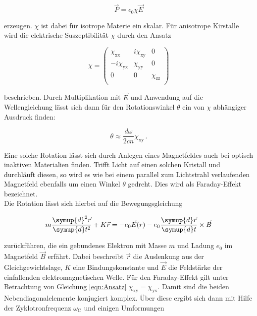 \begin{equation*}
    \vec{P} = \epsilon_0 \chi \vec{E}
\end{equation*}

erzeugen. $\chi$ ist dabei für isotrope Materie ein skalar. Für anisotrope Kirstalle wird die elektrische Suszeptibilität $\chi$ durch 
den Ansatz 

\begin{equation}
    \chi = \left( \begin{array}{rrr}\chi_\text{xx} & i\chi_\text{xy} & 0 \\-i\chi_\text{yx} & \chi_\text{yy} & 0\\0 & 0 & \chi_\text{zz}\\\end{array}\right)
    \label{eqn:Ansatz}
\end{equation}

beschrieben. Durch Multiplikation mit $\vec{E}$ und Anwendung auf die Wellengleichung lässt sich dann für den Rotationswinkel $\theta$ 
ein von $\chi$ abhängiger Ausdruck finden: 

\begin{equation*}
    \theta \approx \frac{d\omega}{2cn}\chi_\text{xy}\,.
\end{equation*}

Eine solche Rotation lässt sich durch Anlegen eines Magnetfeldes auch bei optisch inaktiven Materialien finden. Trifft Licht auf einen solchen
Kristall und durchläuft diesen, so wird es wie bei einem parallel zum Lichtstrahl verlaufenden Magnetfeld ebenfalls um einen Winkel 
$\theta$ gedreht. Dies wird als Faraday-Effekt bezeichnet.\\
Die Rotation lässt sich hierbei auf die Bewegungsgleichung

\begin{equation*}
    m \frac{\symup{d}^2\vec{r}}{\symup{d}t^2}+K\vec{r} = -e_0 \vec{E}(r)-e_0\frac{\symup{d}\vec{r}}{\symup{d}t}\times \vec{B}
\end{equation*}

zurückführen, die ein gebundenes Elektron mit Masse $m$ und Ladung $e_0$ im Magnetfeld $\vec{B}$ erfährt. Dabei beschreibt $\vec{r}$
die Auslenkung aus der Gleichgewichtslage, $K$ eine Bindungskonstante und $\vec{E}$ die Feldstärke der einfallenden elektromagnetischen 
Welle. Für den Faraday-Effekt gilt unter Betrachtung von Gleichung \eqref{eqn:Ansatz} $\chi_\text{xy} = \chi_\text{yx}$. Damit sind die 
beiden Nebendiagonalelemente konjugiert komplex. Über diese ergibt sich dann mit Hilfe der Zyklotronfrequenz $\omega_\text{C}$ und einigen 
Umformungen

